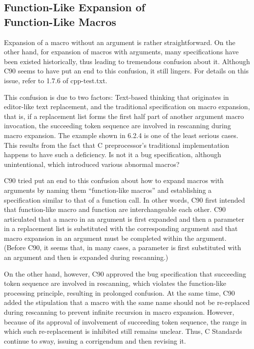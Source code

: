 \documentclass[twocolumn]{article}
\begin{document}
\subsection{Function-Like Expansion of \\
Function-Like Macros}

Expansion of a macro without an argument is rather straightforward.  On the other hand, for expansion of macros with arguments, many specifications have been existed historically, thus leading to tremendous confusion about it.  Although C90 seems to have put an end to this confusion, it still lingers.  For details on this issue, refer to 1.7.6 of cpp-test.txt.

This confusion is due to two factors: Text-based thinking that originates in editor-like text replacement, and the traditional specification on macro expansion, that is, if a replacement list forms the first half part of another argument macro invocation, the succeeding token sequence are involved in rescanning during macro expansion.  The example shown in 6.2.4 is one of the least serious cases.  This results from the fact that C preprocessor's traditional implementation happens to have such a deficiency.  Is not it a bug specification, although unintentional, which introduced various abnormal macros?

C90 tried put an end to this confusion about how to expand macros with arguments by naming them ``function-like macros'' and establishing a specification similar to that of a function call.  In other words, C90 first intended that function-like macro and function are interchangeable each other.  C90 articulated that a macro in an argument is first expanded and then a parameter in a replacement list is substituted with the corresponding argument and that macro expansion in an argument must be completed within the argument.  (Before C90, it seems that, in many cases, a parameter is first substituted with an argument and then is expanded during rescanning.)

On the other hand, however, C90 approved the bug specification that succeeding token sequence are involved in rescanning, which violates the function-like processing principle, resulting in prolonged confusion.  At the same time, C90 added the stipulation that a macro with the same name should not be re-replaced during rescanning to prevent infinite recursion in macro expansion.  However, because of its approval of involvement of succeeding token sequence, the range in which such re-replacement is inhibited still remains unclear.  Thus, C Standards continue to sway, issuing a corrigendum and then revising it.
\end{document}
